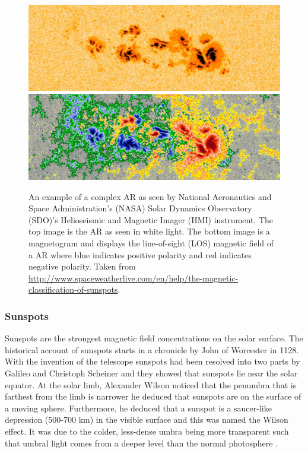 	\begin{figure}
		\centering
		\includegraphics[width=\textwidth]{sunspot.jpg}\\
		\includegraphics[width=\textwidth]{sunspot_magnetic.jpg}\\
		\caption{
			     An example of a complex AR as seen by National Aeronautics and Space Administration's (NASA) Solar Dynamics Observatory (SDO)'s Helioseismic and Magnetic Imager (HMI) instrument.
			     The top image is the AR as seen in white light.
			     The bottom image is a magnetogram and displays the line-of-sight (LOS) magnetic field of a AR where blue indicates positive polarity and red indicates negative polarity.
			     Taken from \url{http://www.spaceweatherlive.com/en/help/the-magnetic-classification-of-sunspots}.	
		        }
		\label{fig:AR_Mag}
	\end{figure}
		
\subsubsection{Sunspots}

    Sunspots are the strongest magnetic field concentrations on the solar surface.
    The historical account of sunspots starts in a chronicle by John of Worcester in 1128.
    With the invention of the telescope sunspots had been resolved into two parts by Galileo and Christoph Scheiner and they showed that sunspots lie near the solar equator.
    At the solar limb, Alexander Wilson noticed that the penumbra that is farthest from the limb is narrower he deduced that sunspots are on the surface of a moving sphere. 
    Furthermore, he deduced that a sunspot is a saucer-like depression (500-700 km) in the visible surface and this was named the Wilson effect.
    It was due to the colder, less-dense umbra being more transparent such that umbral light comes from a deeper level than the normal photosphere \citep{2014masu.book.....P}.

